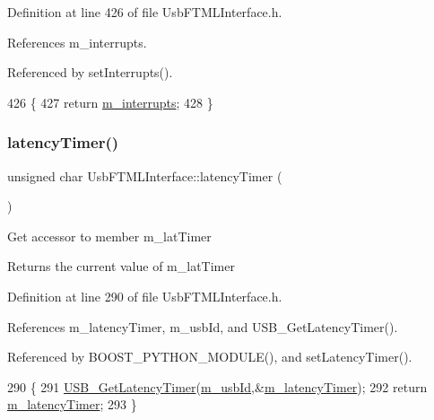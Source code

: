 Definition at line 426 of file Usb\+F\+T\+M\+L\+Interface.\+h.



References m\+\_\+interrupts.



Referenced by set\+Interrupts().


\begin{DoxyCode}
426                      \{
427     \textcolor{keywordflow}{return} \hyperlink{classUsbFTMLInterface_adb6a6a61e78d9b489e6ecefd5752d5ad}{m\_interrupts};
428   \}
\end{DoxyCode}
\mbox{\label{classUsbFTMLInterface_ac94dcd155b2e060d5fe04ccfbbb4de8d}} 
\subsubsection{\texorpdfstring{latency\+Timer()}{latencyTimer()}}
{\footnotesize\ttfamily unsigned char Usb\+F\+T\+M\+L\+Interface\+::latency\+Timer (\begin{DoxyParamCaption}{ }\end{DoxyParamCaption})\hspace{0.3cm}{\ttfamily [inline]}}

Get accessor to member m\+\_\+lat\+Timer \begin{DoxyReturn}{Returns}
the current value of m\+\_\+lat\+Timer 
\end{DoxyReturn}


Definition at line 290 of file Usb\+F\+T\+M\+L\+Interface.\+h.



References m\+\_\+latency\+Timer, m\+\_\+usb\+Id, and U\+S\+B\+\_\+\+Get\+Latency\+Timer().



Referenced by B\+O\+O\+S\+T\+\_\+\+P\+Y\+T\+H\+O\+N\+\_\+\+M\+O\+D\+U\+L\+E(), and set\+Latency\+Timer().


\begin{DoxyCode}
290                                 \{
291     \hyperlink{LALUsbML_8h_a90c0ec96b211bb1b45c4b26afe6f6ced}{USB\_GetLatencyTimer}(\hyperlink{classUsbFTMLInterface_aab6754587c303660d5c498ce34a2b4c8}{m\_usbId},&\hyperlink{classUsbFTMLInterface_a28342ea2c00af670f1376aaa36ad0236}{m\_latencyTimer});
292     \textcolor{keywordflow}{return} \hyperlink{classUsbFTMLInterface_a28342ea2c00af670f1376aaa36ad0236}{m\_latencyTimer};
293   \}
\end{DoxyCode}
\mbox{\label{classUsbFTMLInterface_a55531536a54b736b9c9c38bb792ec4c9}} 
